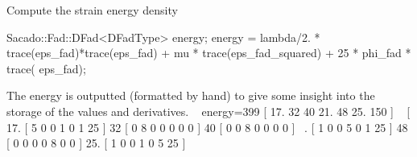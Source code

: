  Compute the strain energy density 
\begin{DoxyCode}
Sacado::Fad::DFad<DFadType> energy;
energy = lambda/2. * trace(eps\_fad)*trace(eps\_fad) + mu * trace(eps\_fad\_squared) + 25 * phi\_fad * trace(
      eps\_fad);
\end{DoxyCode}
 The energy is outputted (formatted by hand) to give some insight into the storage of the values and derivatives. ~\newline
energy=399 \mbox{[} 17. 32 40 21. 48 25. 150 \mbox{]} ~\newline
 \mbox{[} 17. \mbox{[} 5 0 0 1 0 1 25 \mbox{]} 32 \mbox{[} 0 8 0 0 0 0 0 \mbox{]} 40 \mbox{[} 0 0 8 0 0 0 0 \mbox{]} ~. \mbox{[} 1 0 0 5 0 1 25 \mbox{]} 48 \mbox{[} 0 0 0 0 8 0 0 \mbox{]} 25. \mbox{[} 1 0 0 1 0 5 25 \mbox{]} ~\newline

